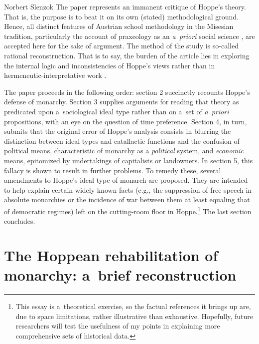 \begin{artengenv}{Norbert Slenzok}
The paper represents an immanent critique of Hoppe's theory. That is, the purpose is to beat it on its own (stated) methodological ground. Hence, all distinct features of Austrian school methodology in the Misesian tradition, particularly the account of praxeology as an \textit{a~priori} social science 
\parencites[see][]{mises_ultimate_1962}[][]{mises_human_1998}[][]{mises_theory_2007}, %
 are accepted here for the sake of argument. The method of the study is so-called rational reconstruction. That is to say, the burden of the article lies in exploring the internal logic and inconsistencies of Hoppe's views rather than in hermeneutic-interpretative work 
\parencite[][]{linsbichler_was_2017}.%




The paper proceeds in the following order: section 2 succinctly recounts Hoppe's defense of monarchy. Section 3 supplies arguments for reading that theory as predicated upon a~sociological ideal type rather than on a~set of \textit{a~priori} propositions, with an eye on the question of time preference. Section 4, in turn, submits that the original error of Hoppe's analysis consists in blurring the distinction between ideal types and catallactic functions and the confusion of political means, characteristic of monarchy as a \textit{political} system, and \textit{economic} means, epitomized by undertakings of capitalists or landowners. In section 5, this fallacy is shown to result in further problems. To remedy these, several amendments to Hoppe's ideal type of monarch are proposed. They are intended to help explain certain widely known facts (e.g., the suppression of free speech in absolute monarchies or the incidence of war between them at least equaling that of democratic regimes) left on the cutting-room floor in Hoppe.\footnote{This essay is a~theoretical exercise, so the factual references it brings up are, due to space limitations, rather illustrative than exhaustive. Hopefully, future researchers will test the usefulness of my points in explaining more comprehensive sets of historical data. } The last section concludes.



\section{The Hoppean rehabilitation of monarchy: a~brief reconstruction}


\end{artengenv}
